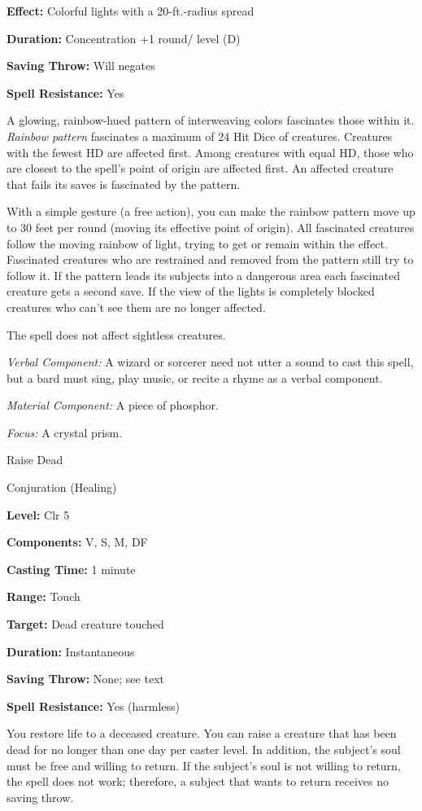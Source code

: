 \documentclass{article}
\begin{document}
\textbf{Effect:} Colorful lights with a 20-ft.-radius spread

\textbf{Duration:} Concentration +1 round/ level (D)

\textbf{Saving Throw: }Will negates

\textbf{Spell Resistance:} Yes

A glowing, rainbow-hued pattern of interweaving colors fascinates those within 
it. \textit{Rainbow pattern }fascinates a maximum of 24 Hit Dice of creatures. 
Creatures with the fewest HD are affected first. Among creatures with equal HD, 
those who are closest to the spell's point of origin are affected first. An affected 
creature that fails its saves is fascinated by the pattern.

With a simple gesture (a free action), you can make the rainbow pattern move up 
to 30 feet per round (moving its effective point of origin). All fascinated creatures 
follow the moving rainbow of light, trying to get or remain within the effect. 
Fascinated creatures who are restrained and removed from the pattern still try 
to follow it. If the pattern leads its subjects into a dangerous area each fascinated 
creature gets a second save. If the view of the lights is completely blocked creatures 
who can't see them are no longer affected.

The spell does not affect sightless creatures.

\textit{Verbal Component: }A wizard or sorcerer need not utter a sound to cast 
this spell, but a bard must sing, play music, or recite a rhyme as a verbal component.

\textit{Material Component: }A piece of phosphor.

\textit{Focus: }A crystal prism.

\vspace{12pt}
Raise Dead

Conjuration (Healing)

\textbf{Level:} Clr 5

\textbf{Components:} V, S, M, DF

\textbf{Casting Time:} 1 minute

\textbf{Range:} Touch

\textbf{Target:} Dead creature touched

\textbf{Duration:} Instantaneous

\textbf{Saving Throw:} None; see text

\textbf{Spell Resistance:} Yes (harmless)

You restore life to a deceased creature. You can raise a creature that has been 
dead for no longer than one day per caster level. In addition, the subject's soul 
must be free and willing to return. If the subject's soul is not willing to return, 
the spell does not work; therefore, a subject that wants to return receives no 
saving throw.
\end{document}
